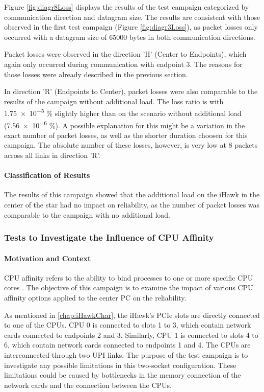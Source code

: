 Figure \ref{fig:diagr8Loss} displays the results of the test campaign categorized by communication direction and datagram size. The results are consistent with those observed in the first test campaign (Figure \ref{fig:diagr3Loss}), as packet losses only occurred with a datagram size of 65000 bytes in both communication directions.

Packet losses were observed in the direction 'H' (Center to Endpoints), which again only occurred during communication with endpoint 3. The reasons for those losses were already described in the previous section.

In direction 'R' (Endpoints to Center), packet losses were also comparable to the results of the campaign without additional load. The loss ratio is with \num{1.75e-5} \% slightly higher than on the scenario without additional load (\num{7.56e-6} \%). A possible explanation for this might be a variation in the exact number of packet losses, as well as the shorter duration choosen for this campaign. The absolute number of these losses, however, is very low at 8 packets across all links in direction 'R'.

\paragraph{Classification of Results}
The results of this campaign showed that the additional load on the iHawk in the center of the star had no impact on reliability, as the number of packet losses was comparable to the campaign with no additional load.


\subsubsection{Tests to Investigate the Influence of CPU Affinity} \label{chap:AffinityAnalysis}
\paragraph{Motivation and Context}

CPU affinity refers to the ability to bind processes to one or more specific CPU cores \cite{reli06}. The objective of this campaign is to examine the impact of various CPU affinity options applied to the center PC on the reliability.

As mentioned in \ref{chap:iHawkChar}, the iHawk's PCIe slots are directly connected to one of the CPUs. CPU 0 is connected to slots 1 to 3, which contain network cards connected to endpoints 2 and 3. Similarly, CPU 1 is connected to slots 4 to 6, which contain network cards connected to endpoints 1 and 4. The CPUs are interconnected through two UPI links. The purpose of the test campaign is to investigate any possible limitations in this two-socket configuration. These limitations could be caused by bottlenecks in the memory connection of the network cards and the connection between the CPUs.

